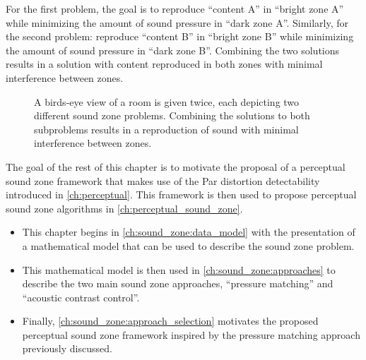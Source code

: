 For the first problem, the goal is to reproduce ``content A'' in ``bright zone A'' while minimizing 
the amount of sound pressure in ``dark zone A''.
Similarly, for the second problem: reproduce ``content B'' in ``bright zone B'' while minimizing the 
amount of sound pressure in ``dark zone B''.
Combining the two solutions results in a solution with content reproduced in both zones with 
minimal interference between zones.

\begin{figure}[]
    \centering
    \begin{subfigure}{0.49\linewidth}
        \centering
        \scalebox{0.9}{}
    \end{subfigure}
    \begin{subfigure}{0.49\linewidth}
        \centering
        \scalebox{0.9}{}
    \end{subfigure}
    \caption{A birds-eye view of a room is given twice, each depicting two different sound zone problems. Combining the solutions to both subproblems results in a reproduction of sound with minimal interference between zones.}
    \label{fig:sound_zones:background:bright_dark_example}
\end{figure}

The goal of the rest of this chapter is to motivate the proposal of a perceptual sound zone framework that makes use
of the Par distortion detectability introduced in \autoref{ch:perceptual}.
This framework is then used to propose perceptual sound zone algorithms in \autoref{ch:perceptual_sound_zone}.
\begin{itemize}
    \item This chapter begins in \autoref{ch:sound_zone:data_model} with the presentation of  
        a mathematical model that can be used to describe the sound zone problem.
    \item This mathematical model is then used in \autoref{ch:sound_zone:approaches} 
        to describe the two main sound zone approaches, ``pressure matching'' and ``acoustic contrast control''.
    \item Finally, \autoref{ch:sound_zone:approach_selection} motivates the proposed perceptual sound zone framework
        inspired by the pressure matching approach previously discussed.
\end{itemize}
